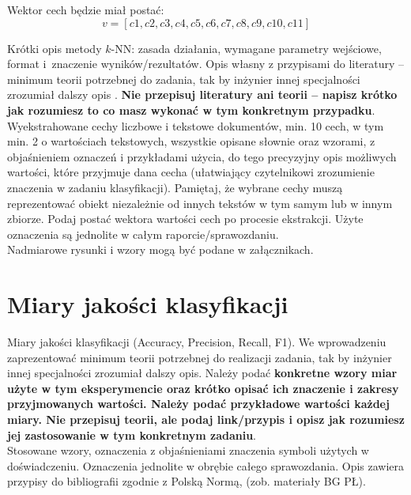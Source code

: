 \documentclass{article}
\begin{document}
Wektor cech będzie miał postać: 
        \begin{equation}
          v = [c1, c2, c3, c4, c5, c6, c7, c8, c9, c10, c11]
        \end{equation}

Krótki opis metody $k$-NN: zasada działania, wymagane parametry wejściowe, format
i~znaczenie wyników/rezultatów. Opis własny z przypisami do literatury -- minimum
teorii potrzebnej do zadania, tak by inżynier innej specjalności zrozumiał dalszy
opis \cite{tadeusiewicz90}. {\bf Nie przepisuj literatury ani teorii -- napisz krótko jak
rozumiesz to co masz wykonać w tym konkretnym przypadku}.\\

Wyekstrahowane cechy liczbowe i tekstowe dokumentów, min. 10 cech, w tym min. 2
o wartościach tekstowych, wszystkie
opisane słownie oraz wzorami, z objaśnieniem oznaczeń i przykładami użycia, do
tego precyzyjny opis możliwych wartości, które przyjmuje dana cecha (ułatwiający
czytelnikowi zrozumienie znaczenia w zadaniu klasyfikacji). Pamiętaj, że wybrane
cechy muszą reprezentować obiekt niezależnie od innych tekstów w tym samym lub w
innym zbiorze. Podaj postać wektora wartości cech po procesie ekstrakcji. Użyte oznaczenia są jednolite w całym
raporcie/sprawozdaniu. \\ 
\indent Nadmiarowe rysunki i wzory mogą być podane w załącznikach. \\

\section{Miary jakości klasyfikacji} 
Miary jakości klasyfikacji (Accuracy, Precision,
Recall, F1). We wprowadzeniu zaprezentować minimum teorii potrzebnej do realizacji
zadania, tak by inżynier innej specjalności zrozumiał dalszy opis. Należy podać {\bf konkretne wzory miar użyte w tym eksperymencie oraz krótko
opisać ich znaczenie i zakresy przyjmowanych wartości. Należy podać przykładowe
wartości każdej miary. Nie przepisuj
teorii, ale podaj link/przypis i opisz jak rozumiesz jej zastosowanie w tym konkretnym
zadaniu}. \\
\indent Stosowane wzory, oznaczenia z objaśnieniami znaczenia symboli użytych w
doświadczeniu. Oznaczenia jednolite w obrębie całego sprawozdania.  Opis zawiera przypisy do bibliografii zgodnie z
Polską Normą, (zob. materiały BG PŁ).\\
\end{document}
